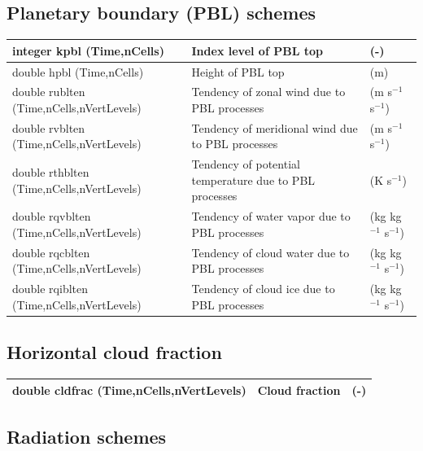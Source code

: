 \documentclass[11pt]{report}
\begin{document}
\subsection{Planetary boundary (PBL) schemes}

{\small
\begin{longtable}{|p{2.0in} |p{3.0in} |p{1.0in}|}
\hline
integer kpbl (Time,nCells)  & Index level of PBL top & (-) \\ \hline
double hpbl (Time,nCells)  & Height of PBL top & (m) \\ \hline
double rublten \hfil\break (Time,nCells,nVertLevels)  & Tendency of zonal wind due to PBL processes  & (m s$^{-1}$ s$^{-1}$) \\ \hline
double rvblten \hfil\break (Time,nCells,nVertLevels)  &  Tendency of meridional wind due to PBL processes & (m s$^{-1}$ s$^{-1}$) \\ \hline
double rthblten  \hfil\break (Time,nCells,nVertLevels)  &  Tendency of potential temperature due to PBL processes& (K s$^{-1}$) \\ \hline
double rqvblten \hfil\break (Time,nCells,nVertLevels)  &  Tendency of water vapor due to PBL processes & (kg kg$^{-1}$ s$^{-1}$) \\ \hline
double rqcblten \hfil\break (Time,nCells,nVertLevels)  &  Tendency of cloud water due to PBL processes & (kg kg$^{-1}$ s$^{-1}$) \\ \hline
double rqiblten \hfil\break (Time,nCells,nVertLevels)  &  Tendency of cloud ice due to PBL processes & (kg kg$^{-1}$ s$^{-1}$) \\ \hline
\end{longtable}
}

\subsection{Horizontal cloud fraction}

{\small
\begin{longtable}{|p{2.0in}|p{3.0in}|p{1.0in}|}
\hline
double cldfrac \hfil\break (Time,nCells,nVertLevels) & Cloud fraction & (-)\\ \hline
\end{longtable}
}

\subsection{Radiation schemes}
\end{document}
